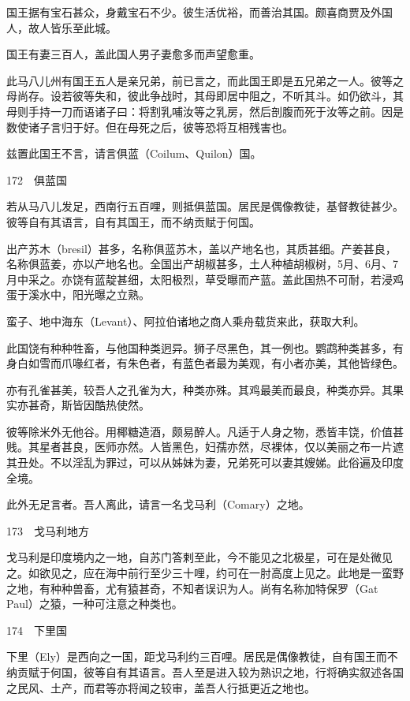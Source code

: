 \documentclass[12pt,UTF8]{ctexbook}
\begin{document}
国王据有宝石甚众，身戴宝石不少。彼生活优裕，而善治其国。颇喜商贾及外国人，故人皆乐至此城。

国王有妻三百人，盖此国人男子妻愈多而声望愈重。

此马八儿州有国王五人是亲兄弟，前已言之，而此国王即是五兄弟之一人。彼等之母尚存。设若彼等失和，彼此争战时，其母即居中阻之，不听其斗。如仍欲斗，其母则手持一刀而语诸子曰：将割乳哺汝等之乳房，然后剖腹而死于汝等之前。因是数使诸子言归于好。但在母死之后，彼等恐将互相残害也。

兹置此国王不言，请言俱蓝（Coilum、Quilon）国。





172　俱蓝国

若从马八儿发足，西南行五百哩，则抵俱蓝国。居民是偶像教徒，基督教徒甚少。彼等自有其语言，自有其国王，而不纳贡赋于何国。

出产苏木（bresil）甚多，名称俱蓝苏木，盖以产地名也，其质甚细。产姜甚良，名称俱蓝姜，亦以产地名也。全国出产胡椒甚多，土人种植胡椒树，5月、6月、7月中采之。亦饶有蓝靛甚细，太阳极烈，草受曝而产蓝。盖此国热不可耐，若浸鸡蛋于溪水中，阳光曝之立熟。

蛮子、地中海东（Levant）、阿拉伯诸地之商人乘舟载货来此，获取大利。

此国饶有种种牲畜，与他国种类迥异。狮子尽黑色，其一例也。鹦鹉种类甚多，有身白如雪而爪喙红者，有朱色者，有蓝色者最为美观，有小者亦美，其他皆绿色。

亦有孔雀甚美，较吾人之孔雀为大，种类亦殊。其鸡最美而最良，种类亦异。其果实亦甚奇，斯皆因酷热使然。

彼等除米外无他谷。用椰糖造酒，颇易醉人。凡适于人身之物，悉皆丰饶，价值甚贱。其星者甚良，医师亦然。人皆黑色，妇孺亦然，尽裸体，仅以美丽之布一片遮其丑处。不以淫乱为罪过，可以从姊妹为妻，兄弟死可以妻其嫂娣。此俗遍及印度全境。

此外无足言者。吾人离此，请言一名戈马利（Comary）之地。





173　戈马利地方

戈马利是印度境内之一地，自苏门答剌至此，今不能见之北极星，可在是处微见之。如欲见之，应在海中前行至少三十哩，约可在一肘高度上见之。此地是一蛮野之地，有种种兽畜，尤有猿甚奇，不知者误识为人。尚有名称加特保罗（Gat Paul）之猿，一种可注意之种类也。





174　下里国

下里（Ely）是西向之一国，距戈马利约三百哩。居民是偶像教徒，自有国王而不纳贡赋于何国，彼等自有其语言。吾人至是进入较为熟识之地，行将确实叙述各国之民风、土产，而君等亦将闻之较审，盖吾人行抵更近之地也。
\end{document}

